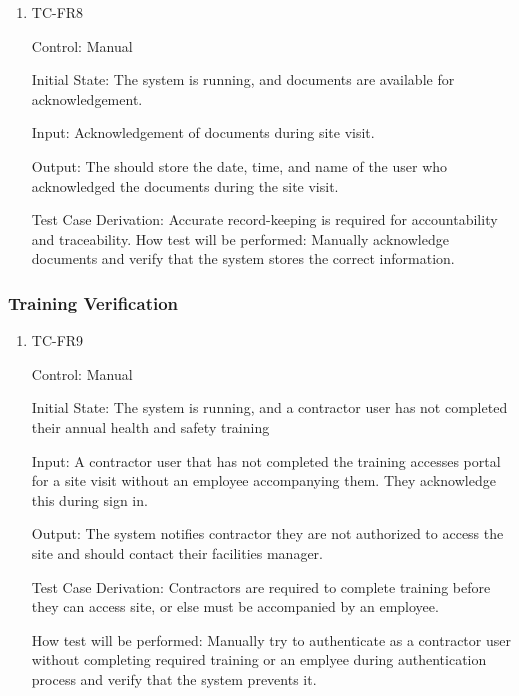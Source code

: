 \documentclass[12pt, titlepage]{article}
\begin{document}
\begin{enumerate}
  \item {TC-FR8\\}

    Control: Manual

    Initial State: The system is running, and documents are available for
    acknowledgement.

    Input: Acknowledgement of documents during site visit.

    Output: The should store the date, time, and name of the
    user who acknowledged the documents during the site visit.

    Test Case Derivation: Accurate record-keeping is required for
    accountability and traceability.
    How test will be performed: Manually acknowledge documents and verify that
    the system stores the correct information.

\end{enumerate}

\subsubsection{Training Verification}

\begin{enumerate}
  \item {TC-FR9\\}

    Control: Manual

    Initial State: The system is running, and a contractor user has
    not completed their annual health and safety training

    Input: A contractor user that has not completed the training
    accesses portal for a site visit
    without an employee accompanying them. They acknowledge this during sign in.

    Output: The system notifies contractor they are not authorized to
    access the site and should contact their facilities manager.

    Test Case Derivation: Contractors are required to complete training before
    they can access site, or else must be accompanied by an employee.

    How test will be performed: Manually try to authenticate
    as a contractor user without completing required training or an
    emplyee during authentication process and verify that
    the system prevents it.

\end{enumerate}
\end{document}
